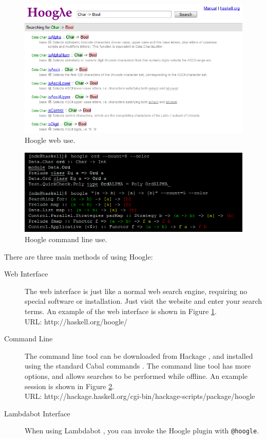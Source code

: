 \documentclass{tmr}
\begin{document}
\begin{figure}[t]
\ifpdf\includegraphics[width=\textwidth]{web.png}\fi
\caption{Hoogle web use.}
\label{fig:web}
\end{figure}

\begin{figure}
\ifpdf\includegraphics[width=\textwidth]{cmdline.png}\fi
\caption{Hoogle command line use.}
\label{fig:cmdline}
\end{figure}

There are three main methods of using Hoogle:

\begin{description}
\item[Web Interface] The web interface is just like a normal web search engine, requiring no special software or installation. Just visit the website and enter your search terms. An example of the web interface is shown in Figure \ref{fig:web}. \\
    URL: \textsf{http://haskell.org/hoogle/}
\item[Command Line] The command line tool can be downloaded from Hackage \cite{hackage}, and installed using the standard Cabal commands \cite{cabal}. The command line tool has more options, and allows searches to be performed while offline. An example session is shown in Figure \ref{fig:cmdline}. \\
    URL: \textsf{http://hackage.haskell.org/cgi-bin/hackage-scripts/package/hoogle}
\item[Lambdabot Interface] When using Lambdabot \cite{lambdabot}, you can invoke the Hoogle plugin with \texttt{@hoogle}.
\end{description}
\end{document}
